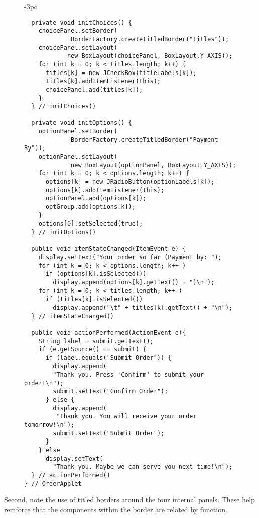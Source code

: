 \begin{figure}[p]
\addtocounter{figure}{-1}
\jjjprogstart
\begin{jjjlistingleft}[29pc]{-3pc}
\begin{lstlisting}
  private void initChoices() {
    choicePanel.setBorder(
             BorderFactory.createTitledBorder("Titles"));
    choicePanel.setLayout(
            new BoxLayout(choicePanel, BoxLayout.Y_AXIS));
    for (int k = 0; k < titles.length; k++) {
      titles[k] = new JCheckBox(titleLabels[k]);
      titles[k].addItemListener(this);
      choicePanel.add(titles[k]);
    }
  } // initChoices()

  private void initOptions() {
    optionPanel.setBorder(
             BorderFactory.createTitledBorder("Payment By"));
    optionPanel.setLayout(
             new BoxLayout(optionPanel, BoxLayout.Y_AXIS));
    for (int k = 0; k < options.length; k++) {
      options[k] = new JRadioButton(optionLabels[k]);
      options[k].addItemListener(this);
      optionPanel.add(options[k]);
      optGroup.add(options[k]);
    }
    options[0].setSelected(true);
  } // initOptions()

  public void itemStateChanged(ItemEvent e) {
    display.setText("Your order so far (Payment by: ");
    for (int k = 0; k < options.length; k++ )
      if (options[k].isSelected())
        display.append(options[k].getText() + ")\n");
    for (int k = 0; k < titles.length; k++ )
      if (titles[k].isSelected())
        display.append("\t" + titles[k].getText() + "\n");
  } // itemStateChanged()

  public void actionPerformed(ActionEvent e){
    String label = submit.getText();
    if (e.getSource() == submit) {
      if (label.equals("Submit Order")) {
        display.append(
        "Thank you. Press 'Confirm' to submit your order!\n");
        submit.setText("Confirm Order");
      } else {
        display.append(
         "Thank you. You will receive your order tomorrow!\n");
        submit.setText("Submit Order");
      }
    } else
      display.setText(
        "Thank you. Maybe we can serve you next time!\n");
  } // actionPerformed()
} // OrderApplet
\end{lstlisting}
\end{jjjlistingleft}
\end{figure}

Second, note the use of titled borders around the four internal
panels. These help reinforce that the components within the
border are related by function.

